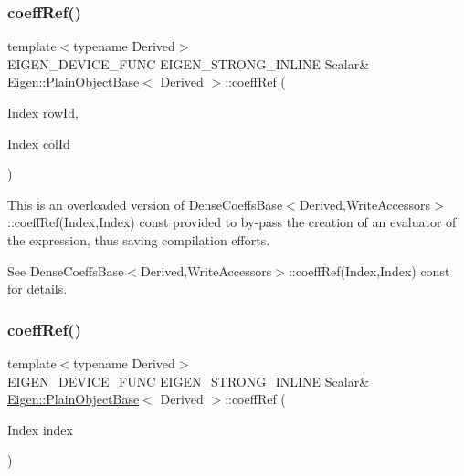 \subsubsection{\texorpdfstring{coeffRef()}{coeffRef()}\hspace{0.1cm}{\footnotesize\ttfamily [1/4]}}
{\footnotesize\ttfamily template$<$typename Derived$>$ \\
E\+I\+G\+E\+N\+\_\+\+D\+E\+V\+I\+C\+E\+\_\+\+F\+U\+NC E\+I\+G\+E\+N\+\_\+\+S\+T\+R\+O\+N\+G\+\_\+\+I\+N\+L\+I\+NE Scalar\& \mbox{\hyperlink{class_eigen_1_1_plain_object_base}{Eigen\+::\+Plain\+Object\+Base}}$<$ Derived $>$\+::coeff\+Ref (\begin{DoxyParamCaption}\item[{Index}]{row\+Id,  }\item[{Index}]{col\+Id }\end{DoxyParamCaption})\hspace{0.3cm}{\ttfamily [inline]}}

This is an overloaded version of Dense\+Coeffs\+Base$<$\+Derived,\+Write\+Accessors$>$\+::coeff\+Ref(\+Index,\+Index) const provided to by-\/pass the creation of an evaluator of the expression, thus saving compilation efforts.

See Dense\+Coeffs\+Base$<$\+Derived,\+Write\+Accessors$>$\+::coeff\+Ref(\+Index,\+Index) const for details. \mbox{\label{class_eigen_1_1_plain_object_base_a571632ed666076d7403c8bd3eece44f0}} 
\subsubsection{\texorpdfstring{coeffRef()}{coeffRef()}\hspace{0.1cm}{\footnotesize\ttfamily [2/4]}}
{\footnotesize\ttfamily template$<$typename Derived$>$ \\
E\+I\+G\+E\+N\+\_\+\+D\+E\+V\+I\+C\+E\+\_\+\+F\+U\+NC E\+I\+G\+E\+N\+\_\+\+S\+T\+R\+O\+N\+G\+\_\+\+I\+N\+L\+I\+NE Scalar\& \mbox{\hyperlink{class_eigen_1_1_plain_object_base}{Eigen\+::\+Plain\+Object\+Base}}$<$ Derived $>$\+::coeff\+Ref (\begin{DoxyParamCaption}\item[{Index}]{index }\end{DoxyParamCaption})\hspace{0.3cm}{\ttfamily [inline]}}

